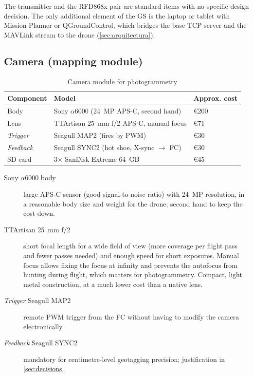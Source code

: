 The transmitter and the RFD868x pair are standard items with no specific design decision. The only additional element of the GS is the laptop or tablet with Mission Planner or QGroundControl, which bridges the base TCP server and the MAVLink stream to the drone (\cref{sec:arquitectura}).

\subsection{Camera (mapping module)}

\begin{table}[H]
    \centering
    \caption{Camera module for photogrammetry}
    \label{tab:materials-camera}
    \begin{tabular}{lll}
        \toprule
        Component & Model & Approx. cost \\
        \midrule
        Body & Sony $\alpha$6000 (24~MP APS-C, second hand) & €200 \\
        Lens & TTArtisan 25~mm f/2 APS-C, manual focus & €71 \\
        \emph{Trigger} & Seagull MAP2 (fires by PWM) & €30 \\
        \emph{Feedback} & Seagull SYNC2 (hot shoe, X-sync $\rightarrow$ FC) & €30 \\
        SD card & 3$\times$ SanDisk Extreme 64~GB & €45 \\
        \bottomrule
    \end{tabular}
\end{table}

\begin{description}
    \item[Sony $\alpha$6000 body] large APS-C sensor (good signal-to-noise ratio) with 24~MP resolution, in a reasonable body size and weight for the drone; second hand to keep the cost down.
    \item[TTArtisan 25~mm f/2] short focal length for a wide field of view (more coverage per flight pass and fewer passes needed) and enough speed for short exposures. Manual focus allows fixing the focus at infinity and prevents the autofocus from hunting during flight, which matters for photogrammetry. Compact, light metal construction, at a much lower cost than a native lens.
    \item[\emph{Trigger} Seagull MAP2] remote PWM trigger from the FC without having to modify the camera electronically.
    \item[\emph{Feedback} Seagull SYNC2] mandatory for centimetre-level geotagging precision; justification in \cref{sec:decisions}.
\end{description}

